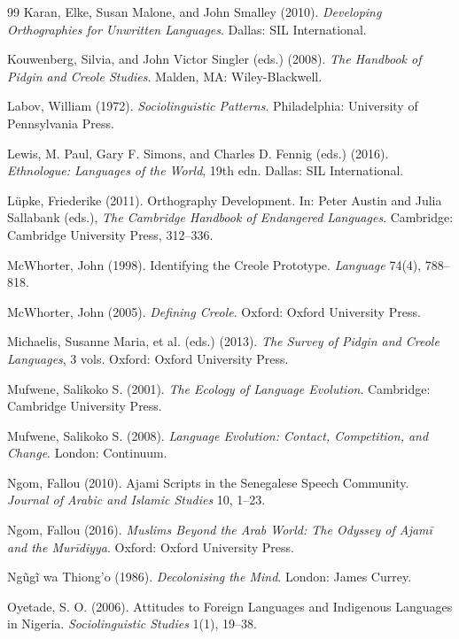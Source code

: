 \documentclass[12pt]{article}
\begin{document}
\begin{thebibliography}{99}
Karan, Elke, Susan Malone, and John Smalley (2010).
\textit{Developing Orthographies for Unwritten Languages}.
Dallas: SIL International.

Kouwenberg, Silvia, and John Victor Singler (eds.) (2008).
\textit{The Handbook of Pidgin and Creole Studies}.
Malden, MA: Wiley-Blackwell.

Labov, William (1972).
\textit{Sociolinguistic Patterns}.
Philadelphia: University of Pennsylvania Press.

Lewis, M. Paul, Gary F. Simons, and Charles D. Fennig (eds.) (2016).
\textit{Ethnologue: Languages of the World}, 19th edn.
Dallas: SIL International.

Lüpke, Friederike (2011).
Orthography Development.
In: Peter Austin and Julia Sallabank (eds.),
\textit{The Cambridge Handbook of Endangered Languages}.
Cambridge: Cambridge University Press, 312--336.

McWhorter, John (1998).
Identifying the Creole Prototype.
\textit{Language} 74(4), 788--818.

McWhorter, John (2005).
\textit{Defining Creole}.
Oxford: Oxford University Press.

Michaelis, Susanne Maria, et al. (eds.) (2013).
\textit{The Survey of Pidgin and Creole Languages}, 3 vols.
Oxford: Oxford University Press.

Mufwene, Salikoko S. (2001).
\textit{The Ecology of Language Evolution}.
Cambridge: Cambridge University Press.

Mufwene, Salikoko S. (2008).
\textit{Language Evolution: Contact, Competition, and Change}.
London: Continuum.

Ngom, Fallou (2010).
Ajami Scripts in the Senegalese Speech Community.
\textit{Journal of Arabic and Islamic Studies} 10, 1--23.

Ngom, Fallou (2016).
\textit{Muslims Beyond the Arab World: The Odyssey of \textit{Ajam\={i}} and the Mur\={i}diyya}.
Oxford: Oxford University Press.

Ngũgĩ wa Thiong'o (1986).
\textit{Decolonising the Mind}.
London: James Currey.

Oyetade, S. O. (2006).
Attitudes to Foreign Languages and Indigenous Languages in Nigeria.
\textit{Sociolinguistic Studies} 1(1), 19--38.


\end{thebibliography}
\end{document}
